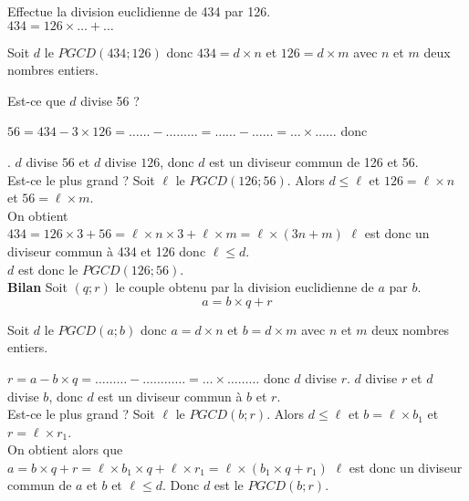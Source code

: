 
Effectue la division euclidienne de 434 par 126.\\
$434=126\times\ldots+\ldots$
\par Soit $d$ le $PGCD(434;126)$ donc $434=d\times n$ et $126=d\times m$ avec $n$ et $m$ deux nombres entiers.
\par Est-ce que $d$ divise 56 ?
\par$56=434-3\times126=\ldots\ldots-\ldots\ldots\ldots=\ldots\ldots-\ldots\ldots=\ldots\times\ldots\ldots$ donc
\dotfill\par\dotfill.
$d$ divise $56$ et 
$d$ divise $126$, donc
 $d$ est un diviseur commun de 126 et 56.\\
Est-ce le plus grand ?
Soit $\ell$ le $PGCD(126;56)$. Alors $d\leqslant\ell$ et $126=\ell\times n$ et $56=\ell\times m$.
\\On obtient\\
$434=126\times3+56=\ell\times n\times3+\ell\times m=\ell\times(3n+m)$
$\ell$ est donc un diviseur commun à 434 et 126 donc $\ell\leqslant d$.
\\$d$ est donc le $PGCD(126;56)$.\\
\textbf{Bilan}
Soit $(q;r)$ le couple obtenu par la division euclidienne de $a$ par $b$.
\[a=b\times q+r\]
\par Soit $d$ le $PGCD(a;b)$ donc $a=d\times n$ et $b=d\times m$ avec $n$ et $m$ deux nombres entiers.
\par$r=a-b\times q=\ldots\ldots\ldots-\ldots\ldots\ldots\ldots=\ldots\times\ldots\ldots\ldots$ donc $d$ divise $r$.
$d$ divise $r$ et 
$d$ divise $b$, donc $d$ est un diviseur commun à $b$ et $r$.\\
Est-ce le plus grand ?
Soit $\ell$ le $PGCD(b;r)$. Alors $d\leqslant\ell$ et $b=\ell\times b_1$ et $r=\ell\times r_1$.
\\On obtient alors que \\
$a=b\times q+r=\ell\times b_1\times q+\ell\times r_1=\ell\times(b_1\times q+r_1)$
$\ell$ est donc un diviseur commun de $a$ et $b$ et $\ell\leqslant d$.
Donc $d$ est le $PGCD(b;r)$.